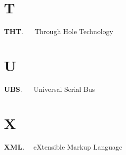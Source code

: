 {
	\section*{T}
}

\noindent 
\textbf{THT}. \ \ 	\label{THT} Through Hole Technology

{
	\section*{U}
}

\noindent 
\textbf{UBS}. \ \ 	\label{USB} Universal Serial Bus


{
	\section*{X}
}
\noindent 
\textbf{XML}. \label{XML} \ \ eXtensible Markup Language


